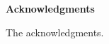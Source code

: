 \documentclass[../GameComposer.tex]{subfiles}
\begin{document}
\vspace{0.5cm}
\begin{center}
\LARGE \textbf{Acknowledgments}
\end{center}

The acknowledgments.
\end{document}
